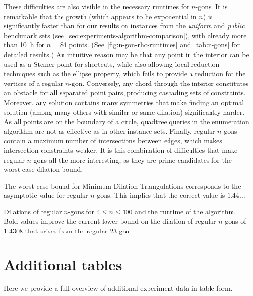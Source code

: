 These difficulties are also visible in the necessary runtimes for $n$-gons.
It is remarkable that the growth (which appears to be exponential in $n$)
is significantly faster than for our results on 
instances from the \emph{uniform} and \emph{public} benchmark sets (see~\cref{sec:experiments-algorithm-comparison}),
with already more than \qty{10}{h} for $n = 84$ points.
(See~\cref{fig:n-gon-rho-runtimes} and~\cref{tab:n-gons} for detailed results.)
An intuitive reason may be that any point in the interior can be used as a Steiner point for shortcuts, 
while also allowing local reduction techniques such as the ellipse property, which fails
to provide a reduction for the vertices of a regular $n$-gon. Conversely, any chord
through the interior constitutes an obstacle for all separated point pairs, producing
cascading sets of constraints. Moreover, 
any solution contains many symmetries that make finding an optimal solution (among many others with similar or same dilation) significantly harder.
As all points are on the boundary of a circle, quadtree queries in the enumeration algorithm are not as effective as in other instance sets.
Finally, regular $n$-gons contain a maximum number of intersections between edges, which makes intersection constraints weaker.
It is this combination of difficulties that make regular $n$-gons all the more interesting,
as they are prime candidates for the worst-case dilation bound.

\begin{conjecture}
\label{con:worst}
The worst-case bound for Minimum Dilation Triangulations corresponds to the 
asymptotic value for regular $n$-gons. This implies that the correct 
value is $1.44\ldots$
\end{conjecture}

\begin{table}[t!p]
    \centering
    
    \caption{Dilations of regular $n$-gons for $4 \leq n \leq 100$ and the runtime of the \binmdt{} algorithm. Bold values improve the current lower bound on the dilation of regular $n$-gons of $1.4308$ that arises from the regular $23$-gon.}
    \label{tab:n-gons}
\end{table}

\clearpage

\section{Additional tables}
Here we provide a full overview of additional experiment data in table form.

